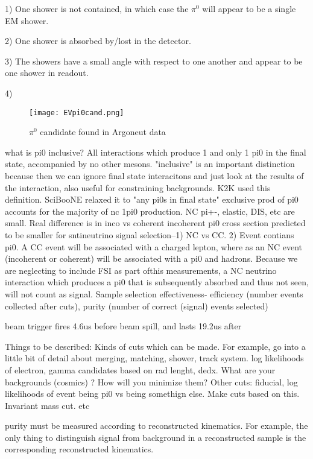 \documentclass[12pt]{article}
\begin{document}
\par 1) One shower is not contained, in which case the $\pi^0$ will appear to be a single EM shower.
\par 2) One shower is absorbed by/lost in the detector.
\par 3) The showers have a small angle with respect to one another and appear to be one shower in readout.
\par 4)
\\\begin{figure}[h!]
\centering
\texttt{[image: EVpi0cand.png]}
\caption{$\pi^0$ candidate found in Argoneut data}
\end{figure}
\par what is pi0 inclusive? All interactions which produce 1 and only 1 pi0 in the final state, accompanied by no other mesons. "inclusive" is an important distinction because then we can ignore final state interacitons and just look at the results of the interaction, also useful for constraining backgrounds.  K2K used this definition. SciBooNE relaxed it to "any pi0s in final state" exclusive prod of pi0 accounts for the majority of nc 1pi0 production.  NC pi+-, elastic, DIS, etc are small.  Real difference is in inco vs coherent incoherent pi0 cross section predicted to be smaller for sntineutrino signal selection--1) NC vs CC. 2) Event contians pi0.  A CC event will be associated with a charged lepton, where as an NC event (incoherent or coherent) will be associated with a pi0 and hadrons.  Because we are neglecting to include FSI as part ofthis measurements, a NC neutrino interaction which produces a pi0 that is subsequently absorbed and thus not seen, will not count as signal.  
Sample selection effectiveness- efficiency (number events collected after cuts), purity (number of correct (signal) events selected) 

beam trigger fires 4.6us before beam spill, and lasts 19.2us after

Things to be described: Kinds of cuts which can be made.  For example, go into a little bit of detail about merging, matching, shower, track system. log likelihoods of electron, gamma candidates based on rad lenght, dedx.   What are your backgrounds (cosmics) ? How will you minimize them? 
Other cuts: fiducial, log likelihoods of event being pi0 vs being somethign else.  Make cuts based on this. Invariant mass cut. etc

purity must be measured according to reconstructed kinematics. For example, the only thing to distinguish signal from background in a reconstructed sample is the corresponding reconstructed kinematics.
\end{document}
